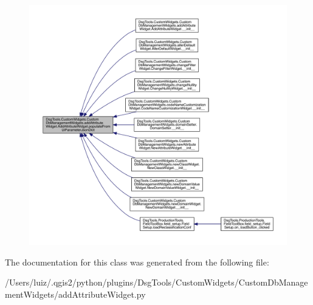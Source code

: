 \begin{figure}[H]
\begin{center}
\leavevmode
\includegraphics[width=350pt]{class_dsg_tools_1_1_custom_widgets_1_1_custom_db_management_widgets_1_1add_attribute_widget_1_1_add_attribute_widget_a878e493b127050a4241892d85d437e9e_icgraph}
\end{center}
\end{figure}


The documentation for this class was generated from the following file\+:\begin{DoxyCompactItemize}
\item 
/\+Users/luiz/.\+qgis2/python/plugins/\+Dsg\+Tools/\+Custom\+Widgets/\+Custom\+Db\+Management\+Widgets/add\+Attribute\+Widget.\+py\end{DoxyCompactItemize}

